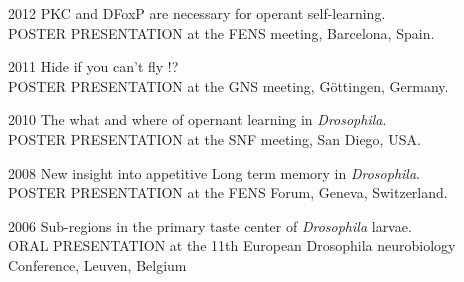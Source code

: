 \begin{itemize}
%
%
%

%
\begin{sloppypar}
\item[2012] PKC and DFoxP are necessary for operant self-learning. 
\\POSTER PRESENTATION at the FENS meeting, Barcelona, Spain.


\item[2011] Hide if you can't fly !?
\\POSTER PRESENTATION at the GNS meeting, G\"{o}ttingen, Germany.

\item[2010] The what and where of opernant learning in \textit{Drosophila}.
\\POSTER PRESENTATION at the SNF meeting, San Diego, USA.
%
\item[2008] New insight into appetitive Long term memory in \textit{Drosophila}.
\\POSTER PRESENTATION at the FENS Forum, Geneva, Switzerland.


\item[2006] Sub-regions in the primary taste center of \textit{Drosophila} larvae.
\\ORAL PRESENTATION at the 11th European Drosophila neurobiology Conference, Leuven, Belgium



%



\end{sloppypar}
\end{itemize}
